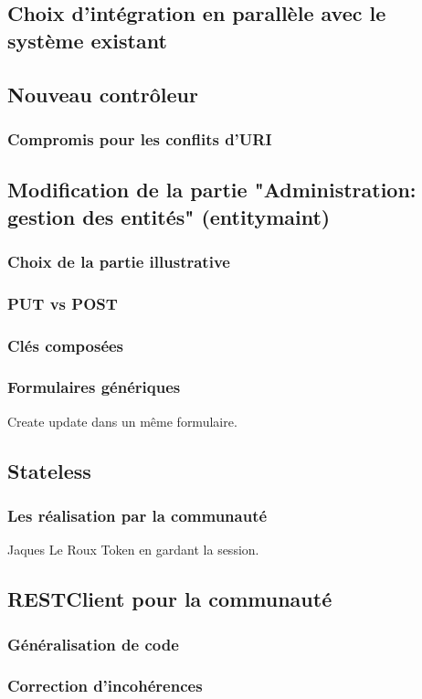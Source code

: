 \subsection{Choix d'intégration en parallèle avec le système existant }
\subsection{Nouveau contrôleur}
\subsubsection{Compromis pour les conflits d'URI}

\subsection{Modification de la partie "Administration: gestion des entités"  (entitymaint)  }
\subsubsection{Choix de la partie illustrative}
\subsubsection{PUT vs POST}
\subsubsection{Clés composées}
\subsubsection{Formulaires génériques }
Create update dans un même formulaire.
\subsection{Stateless}
\subsubsection{Les réalisation par la communauté}

Jaques Le Roux Token en gardant la session.
\subsection{RESTClient pour la communauté}
\subsubsection{Généralisation de code}
\subsubsection{Correction d'incohérences}


